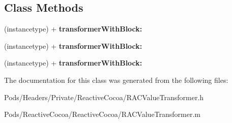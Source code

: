 \subsection*{Class Methods}
\begin{DoxyCompactItemize}
\item 
\mbox{\label{interface_r_a_c_value_transformer_a3e46b1099fabedc19dbcdc4b3871c10b}} 
(instancetype) + {\bfseries transformer\+With\+Block\+:}
\item 
\mbox{\label{interface_r_a_c_value_transformer_a3e46b1099fabedc19dbcdc4b3871c10b}} 
(instancetype) + {\bfseries transformer\+With\+Block\+:}
\item 
\mbox{\label{interface_r_a_c_value_transformer_a3e46b1099fabedc19dbcdc4b3871c10b}} 
(instancetype) + {\bfseries transformer\+With\+Block\+:}
\end{DoxyCompactItemize}


The documentation for this class was generated from the following files\+:\begin{DoxyCompactItemize}
\item 
Pods/\+Headers/\+Private/\+Reactive\+Cocoa/R\+A\+C\+Value\+Transformer.\+h\item 
Pods/\+Reactive\+Cocoa/\+Reactive\+Cocoa/R\+A\+C\+Value\+Transformer.\+m\end{DoxyCompactItemize}
